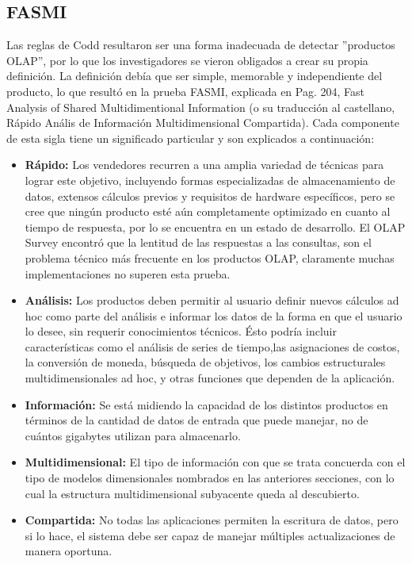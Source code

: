 \documentclass[a4paper,11pt]{article}
\begin{document}
    
    \subsection{FASMI}
    
    Las reglas de Codd resultaron ser una forma inadecuada de detectar ”productos OLAP”, por lo que los investigadores se vieron obligados a crear su propia
    definición. La definición debía que ser simple, memorable y independiente del producto, lo que resultó en la prueba FASMI, explicada en
    \cite{nagabhushana} Pag. 204, Fast Analysis of Shared Multidimentional Information (o su traducción al castellano, Rápido Anális de Información 
    Multidimensional Compartida). Cada componente de esta sigla tiene un significado particular y son explicados a continuación:
    
    \begin{itemize}
      \item \textbf{Rápido:} Los vendedores recurren a una amplia variedad de técnicas para lograr este objetivo, incluyendo formas especializadas de
      almacenamiento de datos, extensos cálculos previos y requisitos de hardware específicos, pero se cree que ningún producto esté aún completamente
      optimizado en cuanto al tiempo de respuesta, por lo se encuentra en un estado de desarrollo. El OLAP Survey encontró que la lentitud de las respuestas
      a las consultas, son el problema técnico más frecuente en los productos OLAP, claramente muchas implementaciones no superen esta prueba.
      \item \textbf{Análisis:} Los productos deben permitir al usuario definir nuevos cálculos ad hoc como parte del análisis e informar los datos de la
      forma en que el usuario lo desee, sin requerir conocimientos técnicos. Ésto podría incluir características como el análisis de series de tiempo,las
      asignaciones de costos, la conversión de moneda, búsqueda de objetivos, los cambios estructurales multidimensionales ad hoc, y otras funciones que
      dependen de la aplicación.
      \item \textbf{Información:} Se está midiendo la capacidad de los distintos productos en términos de la cantidad de datos de entrada que puede manejar,
      no de cuántos gigabytes utilizan para almacenarlo.
      \item \textbf{Multidimensional:} El tipo de información con que se trata concuerda con el tipo de modelos dimensionales nombrados en las anteriores
      secciones, con lo cual la estructura multidimensional subyacente queda al descubierto.
      \item \textbf{Compartida:} No todas las aplicaciones permiten la escritura de datos, pero si lo hace, el sistema debe ser capaz de manejar múltiples
      actualizaciones de manera oportuna.
    \end{itemize}
     
\end{document}
